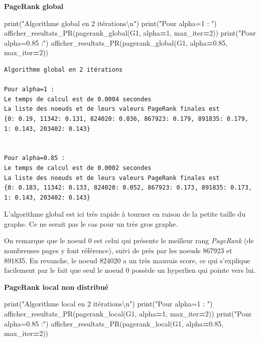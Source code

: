 \documentclass[10pt,a4paper]{article}
\newenvironment{Shaded}{\begin{snugshade}}{\end{snugshade}}
\newcommand{\BuiltInTok}[1]{#1}
\newcommand{\CharTok}[1]{\textcolor[rgb]{0.31,0.60,0.02}{#1}}
\newcommand{\DecValTok}[1]{\textcolor[rgb]{0.00,0.00,0.81}{#1}}
\newcommand{\FloatTok}[1]{\textcolor[rgb]{0.00,0.00,0.81}{#1}}
\newcommand{\NormalTok}[1]{#1}
\newcommand{\OperatorTok}[1]{\textcolor[rgb]{0.81,0.36,0.00}{\textbf{#1}}}
\newcommand{\StringTok}[1]{\textcolor[rgb]{0.31,0.60,0.02}{#1}}
\theoremstyle{break}
\begin{document}
\textbf{PageRank global}

\begin{Shaded}
\begin{Highlighting}[]
\BuiltInTok{print}\NormalTok{(}\StringTok{"Algorithme global en 2 itérations}\CharTok{\textbackslash{}n}\StringTok{"}\NormalTok{)}
\BuiltInTok{print}\NormalTok{(}\StringTok{"Pour alpha=1 : "}\NormalTok{)}
\NormalTok{afficher_resultats_PR(pagerank_global(G1, alpha}\OperatorTok{=}\DecValTok{1}\NormalTok{, max_iter}\OperatorTok{=}\DecValTok{2}\NormalTok{))}
\BuiltInTok{print}\NormalTok{(}\StringTok{"Pour alpha=0.85 :"}\NormalTok{)}
\NormalTok{afficher_resultats_PR(pagerank_global(G1, alpha}\OperatorTok{=}\FloatTok{0.85}\NormalTok{, max_iter}\OperatorTok{=}\DecValTok{2}\NormalTok{)) }
\end{Highlighting}
\end{Shaded}

\begin{verbatim}
Algorithme global en 2 itérations

Pour alpha=1 : 
Le temps de calcul est de 0.0004 secondes
La liste des noeuds et de leurs valeurs PageRank finales est
{0: 0.19, 11342: 0.131, 824020: 0.036, 867923: 0.179, 891835: 0.179, 1: 0.143, 203402: 0.143}


Pour alpha=0.85 :
Le temps de calcul est de 0.0002 secondes
La liste des noeuds et de leurs valeurs PageRank finales est
{0: 0.183, 11342: 0.133, 824020: 0.052, 867923: 0.173, 891835: 0.173, 1: 0.143, 203402: 0.143}
\end{verbatim}

L'algorithme global est ici très rapide à tourner en raison de la petite taille du graphe. Ce ne serait pas le cas pour un très gros graphe.

On remarque que le noeud 0 est celui qui présente le meilleur rang \emph{PageRank} (de nombreuses pages y font référence), suivi de près par les noeuds 867923 et 891835. En revanche, le noeud 824020 a un très mauvais score, ce qui s'explique facilement par le fait que seul le noeud 0 possède un hyperlien qui pointe vers lui.

\textbf{PageRank local non distribué}

\begin{Shaded}
\begin{Highlighting}[]
\BuiltInTok{print}\NormalTok{(}\StringTok{"Algorithme local en 2 itérations}\CharTok{\textbackslash{}n}\StringTok{"}\NormalTok{)}
\BuiltInTok{print}\NormalTok{(}\StringTok{"Pour alpha=1 : "}\NormalTok{)}
\NormalTok{afficher_resultats_PR(pagerank_local(G1, alpha}\OperatorTok{=}\DecValTok{1}\NormalTok{, max_iter}\OperatorTok{=}\DecValTok{2}\NormalTok{))}
\BuiltInTok{print}\NormalTok{(}\StringTok{"Pour alpha=0.85 :"}\NormalTok{)}
\NormalTok{afficher_resultats_PR(pagerank_local(G1, alpha}\OperatorTok{=}\FloatTok{0.85}\NormalTok{, max_iter}\OperatorTok{=}\DecValTok{2}\NormalTok{)) }
\end{Highlighting}
\end{Shaded}
\end{document}
